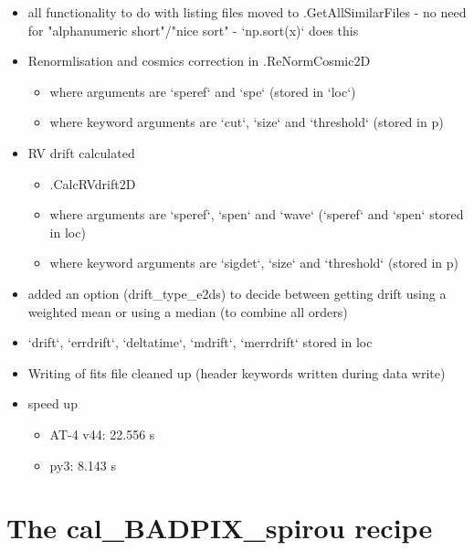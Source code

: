 \begin{itemize}
\item all functionality to do with listing files moved to \spirouImage{\hskip 0pt}.GetAllSimilarFiles - no need for "alphanumeric short"/"nice sort" - `np.sort(x)` does this
    
\item Renormlisation and cosmics correction in \spirouRV.ReNormCosmic2D
	\begin{itemize}
	\item where arguments are `speref` and `spe` (stored in `loc`)
	\item where keyword arguments are `cut`, `size` and `threshold` (stored in p)
	\end{itemize}

\item RV drift calculated
	\begin{itemize}
	\item \spirouRV.CalcRVdrift2D
	\item where arguments are `speref`, `spen` and `wave` (`speref` and `spen` stored in loc)
	\item where keyword arguments are `sigdet`, `size` and `threshold` (stored in p)
	\end{itemize}

\item added an option (drift\_type\_e2ds) to decide between getting drift using a weighted mean or using a median (to combine all orders)

\item `drift`, `errdrift`, `deltatime`, `mdrift`, `merrdrift` stored in loc

\item Writing of fits file cleaned up (header keywords written during data write)

\item speed up
	\begin{itemize}
	\item AT-4 v44: 22.556 s
	\item py3:  8.143 s
	\end{itemize}

\end{itemize}


\section{The cal\_BADPIX\_spirou recipe}
\label{ch:changelog:At4:cal_BADPIX_spirou}

